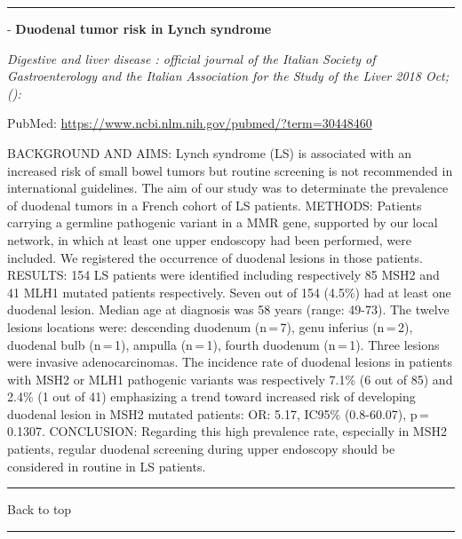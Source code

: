 \documentclass[]{article}
\begin{document}
{}

{}

\begin{center}\rule{0.5\linewidth}{\linethickness}\end{center}

 - \textbf{Duodenal tumor risk in Lynch syndrome}

\emph{Digestive and liver disease : official journal of the Italian
Society of Gastroenterology and the Italian Association for the Study of
the Liver 2018 Oct;():}

PubMed: \url{https://www.ncbi.nlm.nih.gov/pubmed/?term=30448460}

BACKGROUND AND AIMS: Lynch syndrome (LS) is associated with an increased
risk of small bowel tumors but routine screening is not recommended in
international guidelines. The aim of our study was to determinate the
prevalence of duodenal tumors in a French cohort of LS patients.
METHODS: Patients carrying a germline pathogenic variant in a MMR gene,
supported by our local network, in which at least one upper endoscopy
had been performed, were included. We registered the occurrence of
duodenal lesions in those patients. RESULTS: 154 LS patients were
identified including respectively 85 MSH2 and 41 MLH1 mutated patients
respectively. Seven out of 154 (4.5\%) had at least one duodenal lesion.
Median age at diagnosis was 58 years (range: 49-73). The twelve lesions
locations were: descending duodenum (n\,=\,7), genu inferius (n\,=\,2),
duodenal bulb (n\,=\,1), ampulla (n\,=\,1), fourth duodenum (n\,=\,1).
Three lesions were invasive adenocarcinomas. The incidence rate of
duodenal lesions in patients with MSH2 or MLH1 pathogenic variants was
respectively 7.1\% (6 out of 85) and 2.4\% (1 out of 41) emphasizing a
trend toward increased risk of developing duodenal lesion in MSH2
mutated patients: OR: 5.17, IC95\% (0.8-60.07), p\,=\,0.1307.
CONCLUSION: Regarding this high prevalence rate, especially in MSH2
patients, regular duodenal screening during upper endoscopy should be
considered in routine in LS patients.

{}

{}

\begin{center}\rule{0.5\linewidth}{\linethickness}\end{center}

Back to top

\begin{center}\rule{0.5\linewidth}{\linethickness}\end{center}
\end{document}
